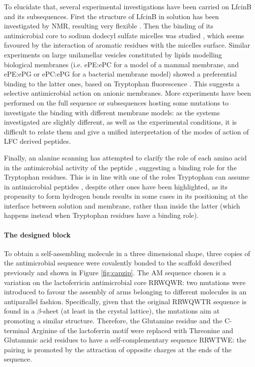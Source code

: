 To elucidate that, several experimental investigations have been carried on LfcinB and its subsequences. First the structure of LfcinB in solution has been investigated by NMR, resulting very flexible \cite{Hwang1998}. Then the binding of its antimicrobial core to sodium dodecyl sulfate micelles was studied \cite{Schibli1999}, which seems favoured by the interaction of aromatic residues with the micelles surface.
%
Similar experiments on large unilamellar vesicles constituted by lipids modelling biological membranes (i.e. ePE:ePC for a model of a mammal membrane, and ePE:ePG or ePC:ePG for a bacterial membrane model)  showed a preferential binding to the latter ones, based on Tryptophan fluorescence \cite{Nguyen2005}. This suggests a selective antimicrobial action on anionic membranes.
%
More experiments have been performed on the full sequence or subsequences hosting some mutations \cite{Tsutsumi2012,Arseneault2010} to investigate the binding with different membrane models: as the systems investigated are slightly different, as well as the experimental conditions, it is difficult to relate them and give a unified interpretation of the modes of action of LFC derived peptides.

Finally, an alanine scanning has attempted to clarify the role of each amino acid in the antimicrobial activity of the peptide \cite{Strom2002}, suggesting a binding role for the Tryptophan residues. This is in line with one of the roles Tryptophan can assume in antimicrobial peptides \cite{Chan2006}, despite other ones have been highlighted, as its propensity to form hydrogen bonds results in some cases in its positioning at the interface between solution and membrane, rather than inside the latter (which happens instead when Tryptophan residues have a binding role).

\paragraph{The designed block}
To obtain a self-assembling molecule in a three dimensional shape, three copies of the antimicrobial sequence were covalently bonded to the scaffold described previously and shown in Figure \ref{fig:capzip}. The AM sequence chosen is a variation on the lactoferricin antimicrobial core RRWQWR: two mutations were introduced to favour the assembly of arms belonging to different molecules in an antiparallel fashion. Specifically, given that the original RRWQWTR sequence is found in a $\beta$-sheet (at least in the crystal lattice), the mutations aim at promoting a similar structure. Therefore, the Glutamine residue and the C-terminal Arginine of the lactoferrin motif were replaced with Threonine and Glutammic acid residues to have a self-complementary sequence RRWTWE: the pairing is promoted by the attraction of opposite charges at the ends of the sequence.

